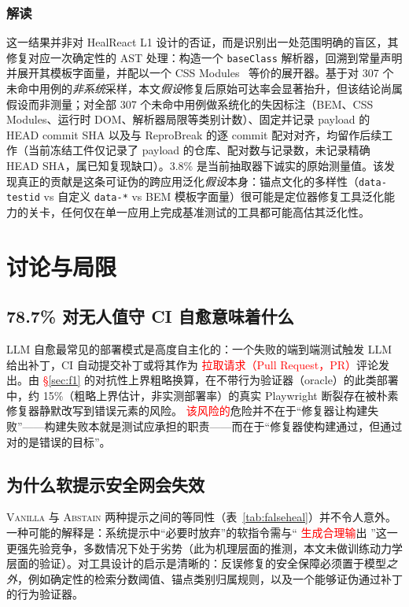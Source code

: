 \documentclass[UTF8, a4paper, 10.5pt, twocolumn, fontset=none]{ctexart}
\newcommand{\rev}[1]{\textcolor{red}{#1}} %
\providecommand{\DIFaddbegin}{} %
\providecommand{\DIFaddend}{} %
\providecommand{\DIFaddtex}[1]{\textcolor{red}{#1}} %
\providecommand{\DIFadd}[1]{\texorpdfstring{\DIFaddtex{#1}}{#1}} %
\providecommand{\DIFaddincludegraphics}[2][]{{\color{blue}\fbox{\DIFOincludegraphics[#1]{#2}}}} %
\DeclareRobustCommand{\DIFaddbegin}{\DIFOaddbegin \let\includegraphics\DIFaddincludegraphics} %
\DeclareRobustCommand{\DIFaddend}{\DIFOaddend \let\includegraphics\DIFOincludegraphics} %
\begin{document}
\subsubsection{解读}
这一结果并非对 HealReact L1 设计的否证，而是识别出一处范围明确的盲区，其修复对应一次确定性的 AST 处理：构造一个 \texttt{baseClass} 解析器，回溯到常量声明并展开其模板字面量，并配以一个 CSS Modules~\cite{cssModules} 等价的展开器。基于对 307 个未命中用例的\emph{非系统}采样，本文\emph{假设}修复后原始可达率会显著抬升，但该结论尚属假设而非测量；对全部 307 个未命中用例做系统化的失因标注（BEM、CSS Modules、运行时 DOM、解析器局限等类别计数）、固定并记录 payload 的 HEAD commit SHA 以及与 ReproBreak 的逐 commit 配对对齐，均留作后续工作（当前冻结工件仅记录了 payload 的仓库、配对数与记录数，未记录精确 HEAD SHA，属已知复现缺口）。3.8\% 是当前抽取器下诚实的原始测量值。该发现真正的贡献是这条可证伪的跨应用泛化\emph{假设}本身：锚点文化的多样性（\texttt{data-testid} vs 自定义 \texttt{data-*} vs BEM 模板字面量）很可能是定位器修复工具泛化能力的关卡，任何仅在单一应用上完成基准测试的工具都可能高估其泛化性。

\section{讨论与局限}
\label{sec:discussion}

\subsection{78.7\% 对无人值守 CI 自愈意味着什么}
LLM 自愈最常见的部署模式是高度自主化的：一个失败的端到端测试触发 LLM 给出补丁，CI 自动提交补丁或将其作为 \DIFaddbegin \DIFadd{\rev{拉取请求（Pull Request，PR）}}\DIFaddend 评论发出。由  \DIFaddbegin \DIFadd{\S\ref{sec:f1} }\DIFaddend 的对抗性上界粗略换算，在不带行为验证器（oracle）的此类部署中，约 15\%（粗略上界估计，非实测部署率）的真实 Playwright 断裂存在被朴素修复器静默改写到错误元素的风险。 \DIFaddbegin \DIFadd{该风险的}\DIFaddend 危险并不在于“修复器让构建失败”——构建失败本就是测试应承担的职责——而在于“修复器使构建通过，但通过对的是错误的目标”。

\subsection{为什么软提示安全网会失效}
\textsc{Vanilla} 与 \textsc{Abstain} 两种提示之间的等同性（表~\ref{tab:falseheal}）并不令人意外。一种可能的解释是：系统提示中“必要时放弃”的软指令需与“ \DIFaddbegin \DIFadd{生成合理输}\DIFaddend 出 ”这一更强先验竞争，多数情况下处于劣势（此为机理层面的推测，本文未做训练动力学层面的验证）。对工具设计的启示是清晰的：反误修复的安全保障必须置于模型\emph{之外}，例如确定性的检索分数阈值、锚点类别归属规则，以及一个能够证伪通过补丁的行为验证器。
\end{document}
